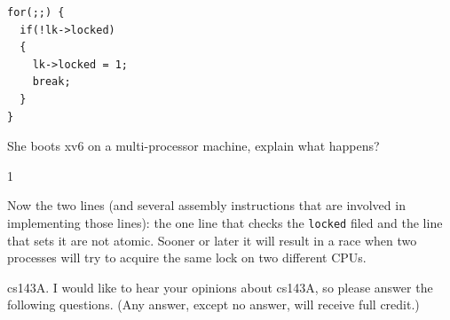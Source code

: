 \documentclass[11pt]{exam}
\def\answers{1}
\begin{document}
\begin{questions}
\begin{parts}
\begin{verbatim}
for(;;) {
  if(!lk->locked)
  {
    lk->locked = 1;
    break;
  }
}
\end{verbatim}

She boots xv6 on a multi-processor machine, explain what happens?

\if\answers1 

Now the two lines (and several assembly instructions that are involved in implementing those lines): the one line 
that checks the \texttt{locked} filed and the line that sets it are not atomic. Sooner or later it will result in a race when 
two processes will try to acquire the same lock on two different CPUs. 

\fi

\vfill 

\end{parts}

\newpage
\addpoints

\question cs143A. I would like to hear your opinions about cs143A, so please answer the following questions. (Any answer, except
no answer, will receive full credit.)





\end{questions}
\end{document}
